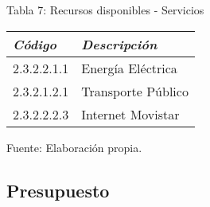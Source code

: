         \begin{table}[h!]
            \centering
            { Tabla 7: Recursos disponibles - Servicios}\par
            \begin{tabular}{|p{3cm}|p{5cm}|} \hline
                 
            
            \textit{{\bf{Código}}} &
            \textit{{\bf{Descripción}}}
            \\ \hline

            2.3.2.2.1.1 &
            Energía Eléctrica
            \\ \hline

            2.3.2.1.2.1 &
            Transporte Público
            \\ \hline

            2.3.2.2.2.3 &
            Internet Movistar
            \\ \hline

            \end{tabular}
            \begin{center}
                \vskip -0.2cm
                {\small{Fuente: Elaboración propia.}}
            \end{center}
        \end{table}





\subsection{Presupuesto}
